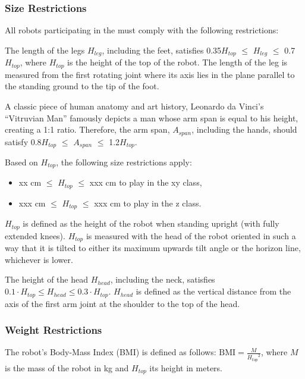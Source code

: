 \subsubsection{Size Restrictions}

All robots participating in the \leaguenameabbr must comply with the following restrictions:

The length of the legs $H_{leg}$, including the feet, satisfies 0.35{\textperiodcentered}$H_{top}$ ${\leq}$ $H_{leg}$ ${\leq}$ 0.7{\textperiodcentered}$H_{top}$,  where $H_{top}$ is the height of the top of the robot. 
The length of the leg is measured from the first rotating joint where its axis lies in the plane parallel to the standing ground to the tip of the foot.

A classic piece of human anatomy and art history, Leonardo da Vinci’s “Vitruvian Man” famously depicts a man whose arm span is equal to his height, creating a 1:1 ratio. 
Therefore, the arm span, $A_{span}$, including the hands, should satisfy 0.8{\textperiodcentered}$H_{top}$ ${\leq}$ $A_{span}$ ${\leq}$ 1.2{\textperiodcentered}$H_{top}$.

Based on $H_{top}$, the following size restrictions apply:

\begin{itemize}
\item xx cm ${\leq}$ $H_{top}$ ${\leq}$ xxx cm to play in the xy class, 
\item xxx cm ${\leq}$ $H_{top}$ ${\leq}$ xxx cm to play in the z class.
\end{itemize}

$H_{top}$ is defined as the height of the robot when standing upright (with fully extended knees).
$H_{top}$ is measured with the head of the robot oriented in such a way that it
is tilted to either its maximum upwards tilt angle or the horizon line,
whichever is lower.

The height of the head $H_{head}$, including the neck, satisfies $0.1 \cdot H_{top} \leq H_{head} \leq 0.3 \cdot H_{top}$. $H_{head}$ is defined as the vertical distance from the axis of the first arm joint at the shoulder to the top of the head.

\subsubsection{Weight Restrictions}

The robot's Body-Mass Index (BMI) is defined as follows:
$\mathrm{BMI} = \frac{M}{{H_{top}}^2}$,
where $M$ is the mass of the robot in kg and $H_{top}$ its height in meters.

